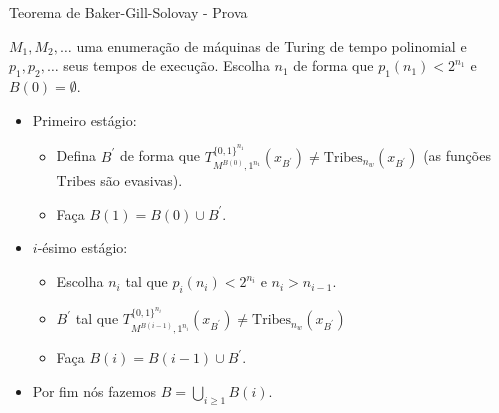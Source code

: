 \documentclass[landscape, 9pt]{beamer}
\newcommand{\binalph}{\{0, 1\}}
\newcommand{\Tribes}{\text{Tribes}}
\begin{document}
\begin{frame} {Teorema de Baker-Gill-Solovay - Prova}

$M_{1}, M_{2}, \dots$ uma enumeração de máquinas de Turing de tempo polinomial e $p_{1}, p_{2}, \dots$ seus tempos de execução. Escolha $n_{1}$ de forma que $p_{1}(n_{1}) < 2^{n_{1}}$ e $B(0) = \emptyset$.

\begin{itemize}

	\item Primeiro estágio:
	
	\begin{itemize}
	
		\item Defina $B^{\prime}$ de forma que $T_{M^{B(0)}, 1^{n_{1}}}^{\binalph^{n_{1}}}(x_{B^{\prime}}) \neq \Tribes_{n_{w}}(x_{B^{\prime}})$ (as funções $\Tribes$ são evasivas).
	
		\item Faça $B(1) = B(0) \cup B^{\prime}$.
	
	\end{itemize}

	\item $i$-ésimo estágio:
	
	\begin{itemize}
	
		\item Escolha $n_{i}$ tal que $p_{i}(n_{i}) < 2^{n_{i}}$ e $n_{i} > n_{i - 1}$.
		
		\item $B^{\prime}$ tal que $T_{M^{B(i - 1)}, 1^{n_{i}}}^{\binalph^{n_{i}}}(x_{B^{\prime}}) \neq \Tribes_{n_{w}}(x_{B^{\prime}})$
		
		\item Faça $B(i) = B(i - 1) \cup B^{\prime}$.
	
	\end{itemize}

	\item Por fim nós fazemos $B = \bigcup_{i \geq 1} B(i)$.

\end{itemize}

\end{frame}

\end{document}
